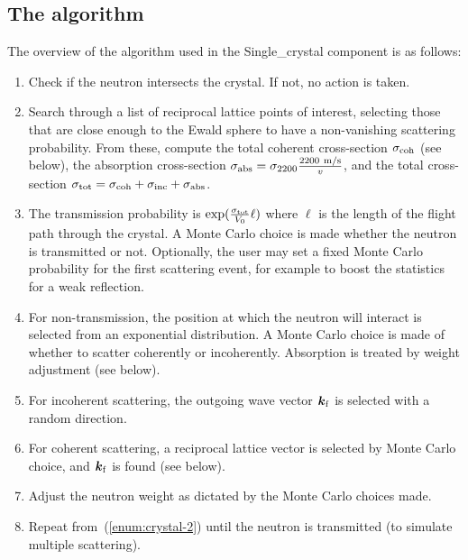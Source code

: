 \subsection{The algorithm}

The overview of the algorithm used in the Single\_crystal component is
as follows:
\begin{enumerate}
\item\label{enum:crystal-1} Check if the neutron intersects the
  crystal. If not, no action is taken.
\item\label{enum:crystal-2} Search through a list of reciprocal lattice
  points of interest, selecting those that are close enough to the Ewald
  sphere to have a non-vanishing scattering probability. From these,
  compute the total coherent cross-section $\sigma_{\rm coh}$ (see
  below), the absorption cross-section $\sigma_{\rm abs} = \sigma_{\rm
  2200} \frac{{\rm 2200~m/s}}{v}$, and the total cross-section
  $\sigma_{\rm tot} = \sigma_{\rm coh}+\sigma_{\rm inc}+\sigma_{\rm abs}$.
\item\label{enum:crystal-3} The transmission probability is
  $\exp(\frac{\sigma_{\rm tot}}{V_0}\ell)$ where $\ell$ is the length of
  the flight path through the crystal. A Monte Carlo choice is made
  whether the neutron is transmitted or not. Optionally, the user may
  set a fixed Monte Carlo probability for the first scattering event,
  for example to boost the statistics for a weak reflection.
\item\label{enum:crystal-4} For non-transmission, the position at which
  the neutron will interact is selected from an exponential
  distribution. A Monte Carlo choice is made of whether to scatter
  coherently or incoherently. Absorption is treated by weight adjustment
  (see below).
\item\label{enum:crystal-5} For incoherent scattering, the outgoing wave
  vector $\boldsymbol{k}_{\rm f}$ is selected with a random direction.
\item\label{enum:crystal-6} For coherent scattering, a reciprocal
  lattice vector is selected by Monte Carlo choice, and
  $\boldsymbol{k}_{\rm f}$ is found (see below).
\item\label{enum:crystal-7} Adjust the neutron weight as dictated by the
  Monte Carlo choices made.
\item\label{enum:crystal-8} Repeat from~(\ref{enum:crystal-2}) until the
  neutron is transmitted (to simulate multiple scattering).
\end{enumerate}

